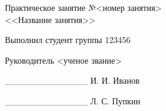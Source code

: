 \thispagestyle{empty}
\setlength{\parindent}{0ex} %

\begin{center}
  Практическое занятие №<номер занятия> \\
  <<Название занятия>>
\end{center}

\vspace{1\baselineskip}

\begin{minipage}{.55\linewidth}
    Выполнил студент группы 123456 

    \smallskip

    Руководитель <ученое звание>
\end{minipage}
\hfill
\begin{minipage}{.4\linewidth}
  \begin{flushright}
    \_\_\_\_\_\_\_\_\_\_\_\_\_ И. И. Иванов 

    \smallskip

    \_\_\_\_\_\_\_\_\_\_\_\_\_ Л. С. Пупкин 
  \end{flushright}
\end{minipage}

\setlength{\parindent}{5ex} %
